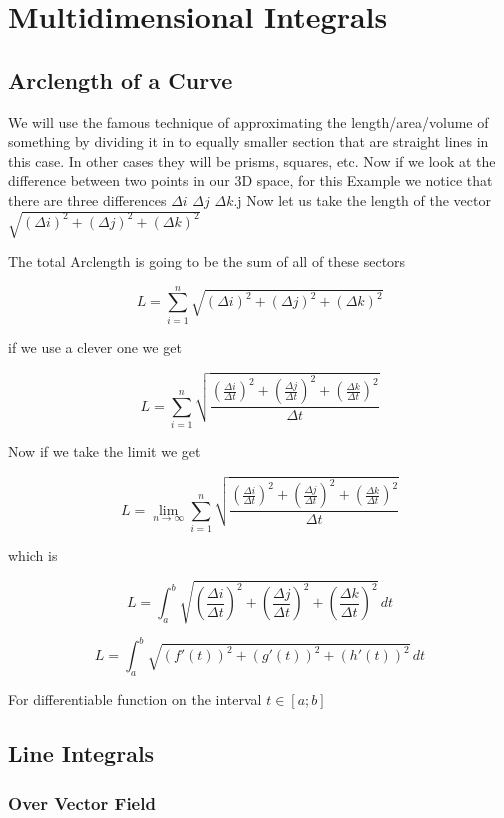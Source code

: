 \newpage
\section{Multidimensional Integrals}

\subsection{Arclength of a Curve}

We will use the famous technique of approximating the length/area/volume of something
by dividing it in to equally smaller section that are straight lines in this case. In other cases 
they will be prisms, squares, etc. Now if we look at the difference between two points in our 3D space, 
for this Example
we notice that there are three differences \(\Delta i\) \(\Delta j\) \(\Delta k\).j
Now let us take the length of the vector \(\sqrt{{(\Delta i)}^2 + {(\Delta j)}^2 + {(\Delta k)}^2}\)

The total Arclength is going to be the sum of all of these sectors

\[
    L =  \sum_{i = 1}^{n}\sqrt{{(\Delta i)}^2 + {(\Delta j)}^2 + {(\Delta k)}^2}
\]

if we use a clever one we get

\[
    L =  \sum_{i = 1}^{n}\sqrt{\frac{{\left(\frac{\Delta i}{\Delta t}\right)}^2 + {\left(\frac{\Delta j}{\Delta t}\right)}^2 + {\left(\frac{\Delta k}{\Delta t}\right)}^2}{\Delta t}}
\]

Now if we take the limit we get

\[
    L =  \lim_{n\to \infty}\sum_{i = 1}^{n}\sqrt{\frac{{\left(\frac{\Delta i}{\Delta t}\right)}^2 + {\left(\frac{\Delta j}{\Delta t}\right)}^2 + {\left(\frac{\Delta k}{\Delta t}\right)}^2}{\Delta t}}
\]

which is 

\[
    L =  \int_{a}^{b}\sqrt{{\left(\frac{\Delta i}{\Delta t}\right)}^2 + {\left(\frac{\Delta j}{\Delta t}\right)}^2 + {\left(\frac{\Delta k}{\Delta t}\right)}^2}\,dt
\]

\[
    L =  \int_{a}^{b}\sqrt{{(f'(t))}^2 + {(g'(t))}^2 + {(h'(t))}^2}\,dt
\]

For differentiable function on the interval \(t \in [a; b]\)

\subsection{Line Integrals}

\subsubsection{Over Vector Field}

